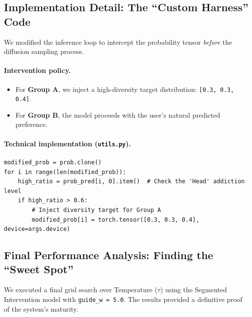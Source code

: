 \documentclass[11pt,a4paper]{article}
\begin{document}
\subsection{Implementation Detail: The ``Custom Harness'' Code}
We modified the inference loop to intercept the probability tensor \emph{before} the diffusion sampling process.

\paragraph{Intervention policy.}
\begin{itemize}[leftmargin=1.4em]
  \item For \textbf{Group A}, we inject a high-diversity target distribution: \texttt{[0.3, 0.3, 0.4]}.
  \item For \textbf{Group B}, the model proceeds with the user’s natural predicted preference.
\end{itemize}

\paragraph{Technical implementation (\texttt{utils.py}).}
\begin{lstlisting}[style=textout]
modified_prob = prob.clone()
for i in range(len(modified_prob)):
    high_ratio = prob_pred[i, 0].item()  # Check the 'Head' addiction level
    if high_ratio > 0.6:
        # Inject diversity target for Group A
        modified_prob[i] = torch.tensor([0.3, 0.3, 0.4], device=args.device)
\end{lstlisting}

\subsection{Final Performance Analysis: Finding the ``Sweet Spot''}
We executed a final grid search over Temperature ($\tau$) using the Segmented Intervention model with \texttt{guide\_w = 5.0}.  
The results provided a definitive proof of the system’s maturity.
\end{document}
